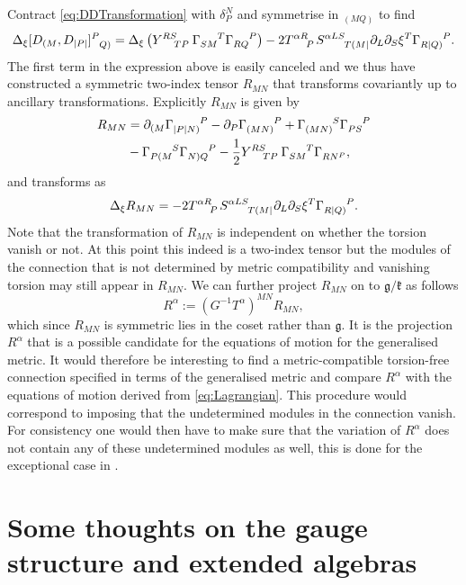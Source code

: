 Contract \eqref{eq:DDTransformation} with $\delta^N_P$ and symmetrise in $_{(MQ)}$ to find 
\begin{equation}
    \Delta_\xi [D_{(M},D_{|P|}]\tensor{}{^P_{Q)}} = \Delta_\xi \left(\tensor{Y}{^{RS}_{TP}}\tensor{\Gamma}{_{SM}^T}\tensor{\Gamma}{_{RQ}^P}\right)-2\tensor{T}{^{\alpha R}_P}\tensor{S}{^{\alpha LS}_{T(M|}}\pd_L\pd_S\xi^T\tensor{\Gamma}{_{R|Q)}^P}.
\end{equation}
The first term in the expression above is easily canceled and we thus have constructed a symmetric two-index tensor $R_{MN}$ that transforms covariantly up to ancillary transformations. Explicitly $R_{MN}$ is given by 
\begin{equation}
    \begin{aligned}
        R_{MN} &= \pd_{(M}\tensor{\Gamma}{_{|P|N)}^P}-\pd_P\tensor{\Gamma}{_{(MN)}^P}+\tensor{\Gamma}{_{(MN)}^S}\tensor{\Gamma}{_{PS}^P}\\
        &-\tensor{\Gamma}{_{P(M}^S}\tensor{\Gamma}{_{N)Q}^P}-\frac{1}{2}\tensor{Y}{^{RS}_{TP}}\tensor{\Gamma}{_{SM}^T}\tensor{\Gamma}{_{RN^P}},
    \end{aligned}
\end{equation}
and transforms as 
\begin{equation}
    \Delta_\xi R_{MN} = -2\tensor{T}{^{\alpha R}_P}\tensor{S}{^{\alpha LS}_{T(M|}}\pd_L\pd_S\xi^T\tensor{\Gamma}{_{R|Q)}^P}.
\end{equation}
Note that the transformation of $R_{MN}$ is independent on whether the torsion vanish or not. At this point this indeed is a two-index tensor but the modules of the connection that is not determined by metric compatibility and vanishing torsion may still appear in $R_{MN}$. We can further project $R_{MN}$ on to $\mathfrak{g}/\mathfrak{k}$ as follows 
\begin{equation}
    R^\alpha := (G^{-1}T^\alpha)^{MN}R_{MN},
\end{equation}
which since $R_{MN}$ is symmetric lies in the coset rather than $\mathfrak{g}$. It is the projection $R^\alpha$ that is a possible candidate for the equations of motion for the generalised metric. It would therefore be interesting to find a metric-compatible torsion-free connection specified in terms of the generalised metric and compare $R^\alpha$ with the equations of motion derived from \eqref{eq:Lagrangian}. This procedure would correspond to imposing that the undetermined modules in the connection vanish. For consistency one would then have to make sure that the variation of $R^\alpha$ does not contain any of these undetermined modules as well, this is done for the exceptional case in \cite{Cederwall:2013naa}.


\section{Some thoughts on the gauge structure and extended algebras\label{sec:GaugeStructureAndExtendedAlgebras}}
